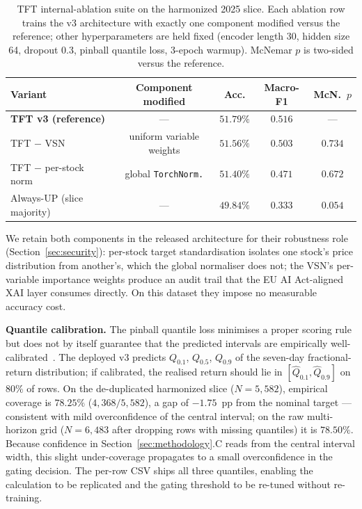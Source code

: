 \documentclass[conference]{IEEEtran}
\begin{document}
\begin{table}[htbp]
\centering
\caption{TFT internal-ablation suite on the harmonized 2025 slice. Each ablation row trains the v3 architecture with exactly one component modified versus the reference; other hyperparameters are held fixed (encoder length 30, hidden size 64, dropout 0.3, pinball quantile loss, 3-epoch warmup). McNemar $p$ is two-sided versus the reference.}
\label{tab:tft_ablations}
\scriptsize
\setlength{\tabcolsep}{4pt}
\begin{tabular}{lcccc}
\toprule
\textbf{Variant} & \textbf{Component modified} & \textbf{Acc.} & \textbf{Macro-F1} & \textbf{McN.\ $p$} \\
\midrule
\textbf{TFT v3 (reference)}   & ---                        & $\mathbf{51.79\%}$ & $\mathbf{0.516}$ & ---     \\
TFT $-$ VSN                   & uniform variable weights   & $51.56\%$ & $0.503$ & $0.734$ \\
TFT $-$ per-stock norm        & global \texttt{TorchNorm.} & $51.40\%$ & $0.471$ & $0.672$ \\
\midrule
Always-UP (slice majority)    & ---                        & $49.84\%$ & $0.333$ & $0.054$ \\
\bottomrule
\end{tabular}
\end{table}

We retain both components in the released architecture for their robustness role (Section~\ref{sec:security}): per-stock target standardisation isolates one stock's price distribution from another's, which the global normaliser does not; the VSN's per-variable importance weights produce an audit trail that the EU AI Act-aligned XAI layer consumes directly. On this dataset they impose no measurable accuracy cost.

\textbf{Quantile calibration.} The pinball quantile loss minimises a proper scoring rule but does not by itself guarantee that the predicted intervals are empirically well-calibrated~\cite{ref:kuleshov,ref:confidence_calibration}. The deployed v3 predicts $Q_{0.1}$, $Q_{0.5}$, $Q_{0.9}$ of the seven-day fractional-return distribution; if calibrated, the realised return should lie in $[\hat{Q}_{0.1}, \hat{Q}_{0.9}]$ on $80\%$ of rows. On the de-duplicated harmonized slice ($N=5{,}582$), empirical coverage is $\mathbf{78.25\%}$ ($4{,}368/5{,}582$), a gap of $-1.75$~pp from the nominal target --- consistent with mild overconfidence of the central interval; on the raw multi-horizon grid ($N=6{,}483$ after dropping rows with missing quantiles) it is $78.50\%$. Because confidence in Section~\ref{sec:methodology}.C reads from the central interval width, this slight under-coverage propagates to a small overconfidence in the gating decision. The per-row CSV ships all three quantiles, enabling the calculation to be replicated and the gating threshold to be re-tuned without re-training.
\end{document}
